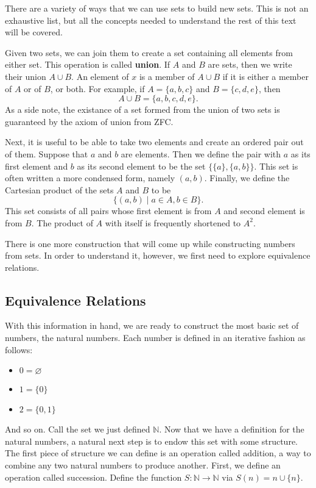 \documentclass[12pt, titlepage]{article}
\begin{document}
There are a variety of ways that we can use sets to build new sets. This is not
an exhaustive list, but all the concepts needed to understand the rest of this
text will be covered.

Given two sets, we can join them to create a set containing all elements from
either set. This operation is called \textbf{union}. If \(A\) and \(B\) are
sets, then we write their union \(A \cup B\). An element of \(x\) is a member
of \(A \cup B\) if it is either a member of \(A\) or of \(B\), or both. For
example, if \(A = \{a, b, c\}\) and \(B = \{c, d, e\}\), then \[A \cup B = \{a,
b, c, d, e\}.\] As a side note, the existance of a set formed from the union of
two sets is guaranteed by the axiom of union from ZFC.

Next, it is useful to be able to take two elements and create an ordered pair
out of them. Suppose that \(a\) and \(b\) are elements. Then we define the pair
with \(a\) as its first element and \(b\) as its second element to be the set
\(\{\{a\}, \{a, b\}\}\). This set is often written a more condensed form,
namely \((a, b)\). Finally, we define the Cartesian product of the sets \(A\)
and \(B\) to be \[\{(a, b) \mid a \in A, b \in B\}.\] This set consists of all
pairs whose first element is from \(A\) and second element is from \(B\). The
product of \(A\) with itself is frequently shortened to \(A^2\).

There is one more construction that will come up while constructing numbers
from sets. In order to understand it, however, we first need to explore
equivalence relations.

\subsection{Equivalence Relations}

With this information in hand, we are ready to construct the most basic set of
numbers, the natural numbers. Each number is defined in an iterative fashion as
follows:

\begin{itemize}[noitemsep]
  \item \(0 = \varnothing\)
  \item \(1 = \{0\}\)
  \item \(2 = \{0, 1\}\)
\end{itemize}

And so on. Call the set we just defined \(\mathbb{N}\). Now that we have a
definition for the natural numbers, a natural next step is to endow this set
with some structure. The first piece of structure we can define is an operation
called addition, a way to combine any two natural numbers to produce another.
First, we define an operation called succession. Define the function \(S :
\mathbb{N} \to \mathbb{N}\) via \(S(n) = n \cup \{n\}\).
\end{document}
